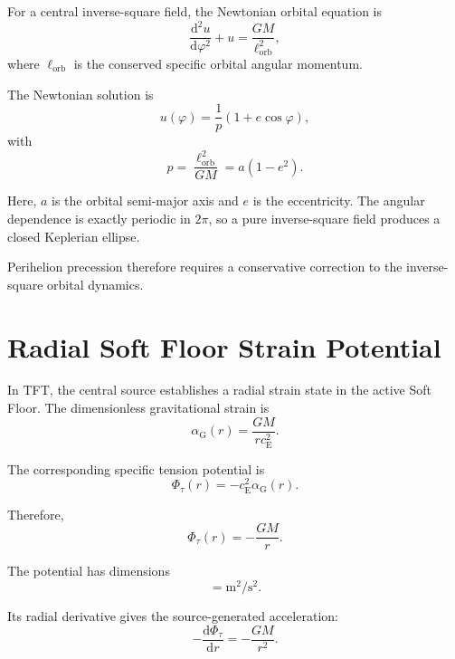 For a central inverse-square field, the Newtonian orbital equation is
\begin{equation}
    \frac{\mathrm{d}^2u}{\mathrm{d}\varphi^2} + u = \frac{GM}{\ell_{\mathrm{orb}}^2},
\end{equation}
where $\ell_{\mathrm{orb}}$ is the conserved specific orbital angular momentum.

The Newtonian solution is
\begin{equation}
    u(\varphi) = \frac{1}{p} \left( 1+e\cos\varphi \right),
\end{equation}
with
\begin{equation}
    p = \frac{\ell_{\mathrm{orb}}^2}{GM} = a(1-e^2).
\end{equation}

Here, $a$ is the orbital semi-major axis and $e$ is the eccentricity. The angular dependence is exactly periodic in $2\pi$, so a pure inverse-square field produces a closed Keplerian ellipse.

Perihelion precession therefore requires a conservative correction to the inverse-square orbital dynamics.

\section{Radial Soft Floor Strain Potential}

In TFT, the central source establishes a radial strain state in the active Soft Floor. The dimensionless gravitational strain is
\begin{equation}
    \alpha_{\mathrm{G}}(r) = \frac{GM}{rc_{\mathrm{E}}^2}.
\end{equation}

The corresponding specific tension potential is
\begin{equation}
    \Phi_\tau(r) = -c_{\mathrm{E}}^2\alpha_{\mathrm{G}}(r).
\end{equation}

Therefore,
\begin{equation}
    \Phi_\tau(r) = -\frac{GM}{r}.
\end{equation}

The potential has dimensions
\begin{equation}
    [\Phi_\tau] = \mathrm{m^2/s^2}.
\end{equation}

Its radial derivative gives the source-generated acceleration:
\begin{equation}
    -\frac{\mathrm{d}\Phi_\tau}{\mathrm{d}r} = -\frac{GM}{r^2}.
\end{equation}

